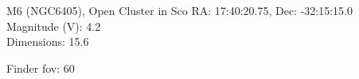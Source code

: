 \begin{block}{M6 (NGC6405), Open Cluster in Sco}
    RA: 17:40:20.75, Dec: -32:15:15.0 \\ 
    Magnitude (V): 4.2 \\ 
    Dimensions: 15.6 

    Finder fov: 60 
\end{block}